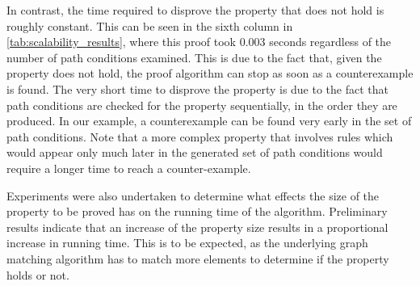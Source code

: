 In contrast, the time required to disprove the property that does not hold is roughly constant. This can be seen in the sixth column in \cref{tab:scalability_results}, where this proof took 0.003 seconds regardless of the number of path conditions examined. This is due to the fact that, given the property does not hold, the proof algorithm can stop as soon as a counterexample is found. The very short time to disprove the property is due to the fact that path conditions are checked for the property sequentially, in the order they are produced. In our example, a counterexample can be found very early in the set of path conditions. Note that a more complex property that involves rules which would appear only much later in the generated set of path conditions would require a longer time to reach a counter-example.

Experiments were also undertaken to determine what effects the size of the property to be proved has on the running time of the algorithm. Preliminary results indicate that an increase of the property size results in a proportional increase in running time. This is to be expected, as the underlying graph matching algorithm has to match more elements to determine if the property holds or not.

% 

